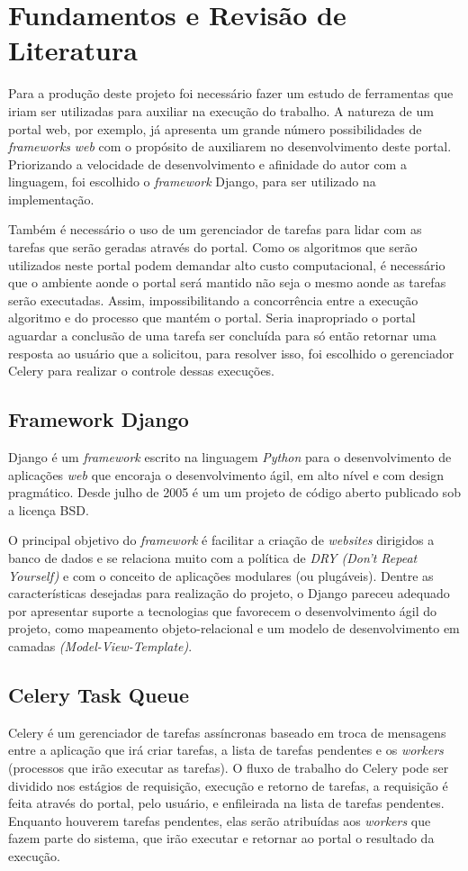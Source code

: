 \documentclass[tg]{mdtufsm}
\begin{document}
\chapter{Fundamentos e Revisão de Literatura}
Para a produção deste projeto foi necessário fazer um estudo de ferramentas que iriam ser utilizadas para auxiliar na execução do trabalho. A natureza de um portal web, por exemplo, já apresenta um grande número possibilidades de \emph{frameworks} \emph{web} com o propósito de auxiliarem no desenvolvimento deste portal. Priorizando a velocidade de desenvolvimento e afinidade do autor com a linguagem, foi escolhido o \emph{framework} Django\cite{Django}, para ser utilizado na implementação.

Também é necessário o uso de um gerenciador de tarefas para lidar com as tarefas que serão geradas através do portal. Como os algoritmos que serão utilizados neste portal podem demandar  alto custo computacional, é necessário que o ambiente aonde o portal será mantido não seja o mesmo aonde as tarefas serão executadas. Assim, impossibilitando a concorrência entre a execução algoritmo e do processo que mantém o portal. Seria inapropriado o portal aguardar a conclusão de uma tarefa ser concluída para só então retornar uma resposta ao usuário que a solicitou, para resolver isso, foi escolhido o gerenciador Celery para realizar o controle dessas execuções.

\section{Framework Django}
Django\cite{Django} é um \emph{framework} escrito na linguagem \emph{Python} para o desenvolvimento de aplicações\emph{ web }que encoraja o desenvolvimento ágil, em alto nível e com design pragmático. Desde julho de 2005 é um um projeto de código aberto publicado sob a licença BSD.

O principal objetivo do \emph{framework} é facilitar a criação de \emph{websites} dirigidos a banco de dados e se relaciona muito com a política de \emph{DRY (Don't Repeat Yourself)} e com o conceito de aplicações modulares (ou plugáveis). Dentre as características desejadas para realização do projeto, o Django pareceu adequado por apresentar suporte a tecnologias que favorecem o desenvolvimento ágil do projeto, como mapeamento objeto-relacional e um modelo de desenvolvimento em camadas \emph{(Model-View-Template)}.

\section{Celery Task Queue}
Celery\cite{Celery} é um gerenciador de tarefas assíncronas baseado em troca de mensagens entre a aplicação que irá criar tarefas, a lista de tarefas pendentes e os \emph{workers} (processos que irão executar as tarefas). O fluxo de trabalho do Celery pode ser dividido nos estágios de requisição, execução e retorno de tarefas, a requisição é feita através do portal, pelo usuário, e enfileirada na lista de tarefas pendentes. Enquanto houverem tarefas pendentes, elas serão atribuídas aos \emph{workers} que fazem parte do sistema, que irão executar e retornar ao portal o resultado da execução.
\end{document}
